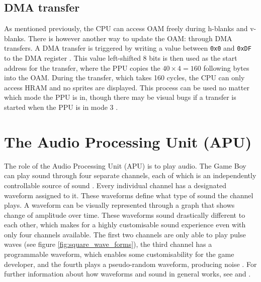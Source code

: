 \subsection{DMA transfer}
As mentioned previously, the CPU can access OAM freely during h-blanks and v-blanks. There is however another way to update the OAM: through DMA transfers. A DMA transfer is triggered by writing a value between \texttt{0x0} and \texttt{0xDF} to the DMA register \cite{pandocsdma}. This value left-shifted 8 bits is then used as the start address for the transfer, where the PPU copies the $40 \times 4 = 160$ following bytes into the OAM. During the transfer, which takes 160 cycles, the CPU can only access HRAM and no sprites are displayed. This process can be used no matter which mode the PPU is in, though there may be visual bugs if a transfer is started when the PPU is in mode 3 \cite{pandocsdma}.


\section{The Audio Processing Unit (APU)}
\label{sec:APU}
The role of the Audio Processing Unit (APU) is to play audio. The Game Boy can play sound through four separate channels, each of which is an independently controllable source of sound \cite{pandocssound}. Every individual channel has a designated waveform assigned to it. These waveforms define what type of sound the channel plays. A waveform can be visually represented through a graph that shows change of amplitude over time. These waveforms sound drastically different to each other, which makes for a highly customisable sound experience even with only four channels available. The first two channels are only able to play pulse waves (see figure \ref{fig:square_wave_forms}), the third channel has a programmable waveform, which enables some customisability for the game developer, and the fourth plays a pseudo-random waveform, producing noise \cite{AudioHardware}. For further information about how waveforms and sound in general works, see \cite{waveforms} and \cite{sinToSquare}.

